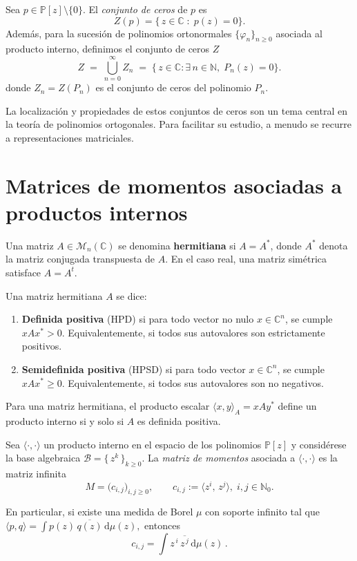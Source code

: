 \begin{definition}\label{def:ceros}
  Sea $p\in\mathbb{P}[z]\setminus\{0\}$.
  El \emph{conjunto de ceros} de $p$ es
  \[
    Z(p)=\bigl\{\,z\in\mathbb{C}\;:\;p(z)=0\bigr\}.
  \]
  Además, para la sucesión de polinomios ortonormales \(\{\varphi_n\}_{n\ge0}\) asociada al producto interno, definimos el conjunto de ceros $Z$
  \[
    Z \;=\; \bigcup_{n=0}^{\infty} Z_n
    \;=\;\bigl\{\,z\in\mathbb{C} : \exists\,n\in\mathbb{N},\;P_n(z)=0\bigr\}.
  \]
  donde $Z_n = Z(P_n)$ es el conjunto de ceros del polinomio $P_n$.
\end{definition}

La localización y propiedades de estos conjuntos de ceros son un tema central en la teoría de polinomios ortogonales. Para facilitar su estudio, a menudo se recurre a representaciones matriciales.

\section{Matrices de momentos asociadas a productos internos}

\begin{definition}\label{def:hermitian_matrix}
  \cite{Horn_Johnson_2012} Una matriz $A \in \mathcal{M}_{n}(\mathbb{C})$ se denomina \textbf{hermitiana} si $A = A^*$, donde $A^*$ denota la matriz conjugada transpuesta de $A$. En el caso real, una matriz simétrica satisface $A = A^t$.

  Una matriz hermitiana $A$ se dice:
  \begin{enumerate}
    \item \textbf{Definida positiva} (HPD) si para todo vector no nulo $x \in \mathbb{C}^n$, se cumple $xAx^* > 0$. Equivalentemente, si todos sus autovalores son estrictamente positivos.

    \item \textbf{Semidefinida positiva} (HPSD) si para todo vector $x \in \mathbb{C}^n$, se cumple $xAx^* \geq 0$. Equivalentemente, si todos sus autovalores son no negativos.
  \end{enumerate}

  Para una matriz hermitiana, el producto escalar $\langle x, y \rangle_A = xAy^*$ define un producto interno si y solo si $A$ es definida positiva.
\end{definition}

\begin{definition}\label{def:moment_matrix}
  Sea \(\langle\!\cdot,\cdot\!\rangle\) un producto interno en el espacio de los polinomios
  \(\mathbb{P}[z]\) y considérese la base algebraica
  \(\mathcal{B}=\{\,z^{k}\,\}_{k\ge 0}\).
  La \emph{matriz de momentos} asociada a \(\langle\!\cdot,\cdot\!\rangle\) es la matriz
  infinita
  \[
    M=\bigl(c_{i,j}\bigr)_{i,j\ge 0},
    \qquad
    c_{i,j}:=\bigl\langle z^{i},\,z^{j}\bigr\rangle ,\; i,j\in\mathbb N_{0}.
  \]

  En particular, si existe una medida de Borel \(\mu\) con soporte infinito tal que
  \(
  \langle p,q\rangle=\displaystyle\int p(z)\,\overline{q(z)}\,\mathrm d\mu(z),
  \)
  entonces
  \[
    c_{i,j}=\int z^{\,i}\,\overline{z^{\,j}}\,\mathrm d\mu(z)\, .
  \]%
\end{definition}

